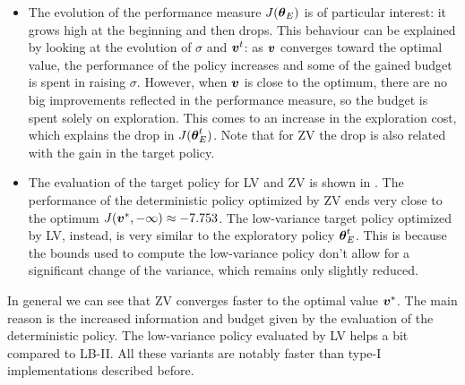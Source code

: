 \begin{itemize}
\item The evolution of the performance measure $J({\boldsymbol{\theta}}_E)$ is of particular interest: it grows high at the beginning and then drops. This behaviour can be explained by looking at the evolution of $\sigma$ and $\boldsymbol{v}^t$: as $\boldsymbol{v}$ converges toward the optimal value, the performance of the policy increases and some of the gained budget is spent in raising $\sigma$. However, when $\boldsymbol{v}$ is close to the optimum, there are no big improvements reflected in the performance measure, so the budget is spent solely on exploration. This comes to an increase in the exploration cost, which explains the drop in $J({\boldsymbol{\theta}}^t_E)$. Note that for ZV the drop is also related with the gain in the target policy.

\item The evaluation of the target policy for LV and ZV is shown in . The performance of the deterministic policy optimized by ZV ends very close to the optimum $J(\boldsymbol{v}^*,-\infty)\approx-7.753$. The low-variance target policy optimized by LV, instead, is very similar to the exploratory policy ${\boldsymbol{\theta}}^t_E$. This is because the bounds used to compute the low-variance policy don't allow for a significant change of the variance, which remains only slightly reduced. 
\end{itemize}

In general we can see that ZV converges faster to the optimal value $\boldsymbol{v}^*$. The main reason is the increased information and budget given by the evaluation of the deterministic policy. The low-variance policy evaluated by LV helps a bit compared to LB-II. All these variants are notably faster than type-I implementations described before.

